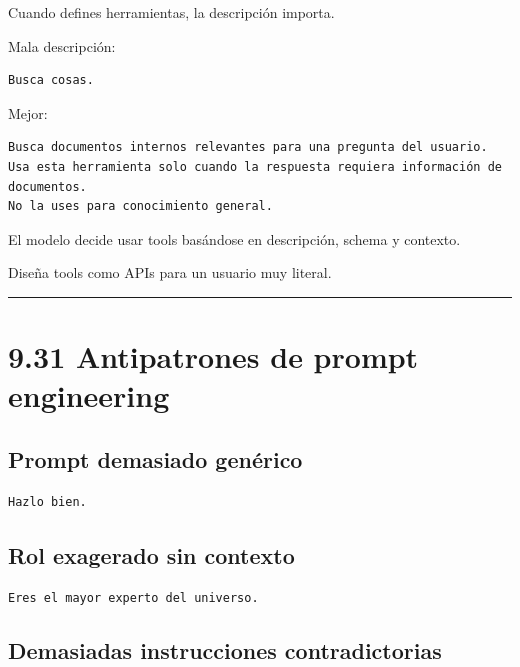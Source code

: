 Cuando defines herramientas, la descripción importa.

Mala descripción:

\begin{lstlisting}
Busca cosas.
\end{lstlisting}

Mejor:

\begin{lstlisting}
Busca documentos internos relevantes para una pregunta del usuario.
Usa esta herramienta solo cuando la respuesta requiera información de documentos.
No la uses para conocimiento general.
\end{lstlisting}

El modelo decide usar tools basándose en descripción, schema y contexto.

Diseña tools como APIs para un usuario muy literal.

\begin{center}\rule{0.5\linewidth}{0.5pt}\end{center}

\section{9.31 Antipatrones de prompt
engineering}\label{antipatrones-de-prompt-engineering}

\subsection{Prompt demasiado
genérico}\label{prompt-demasiado-genuxe9rico}

\begin{lstlisting}
Hazlo bien.
\end{lstlisting}

\subsection{Rol exagerado sin
contexto}\label{rol-exagerado-sin-contexto}

\begin{lstlisting}
Eres el mayor experto del universo.
\end{lstlisting}

\subsection{Demasiadas instrucciones
contradictorias}\label{demasiadas-instrucciones-contradictorias}

